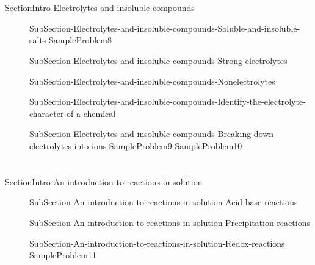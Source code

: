 \documentclass[main.tex]{subfiles} %
\begin{document}
\section{\color{blue!30!black}{Electrolytes and insoluble compounds}}
{SectionIntro-Electrolytes-and-insoluble-compounds}
\sloppy \begin{description}
\item[] {SubSection-Electrolytes-and-insoluble-compounds-Soluble-and-insoluble-salts}
{SampleProblem8}
\vspace{0cm}{Table-Solubility}
\item[]{SubSection-Electrolytes-and-insoluble-compounds-Strong-electrolytes}
\item[]{SubSection-Electrolytes-and-insoluble-compounds-Nonelectrolytes}

\item[]{SubSection-Electrolytes-and-insoluble-compounds-Identify-the-electrolyte-character-of-a-chemical}
 \vspace{1cm}{Table-Electrolytes	}	

\item[]{SubSection-Electrolytes-and-insoluble-compounds-Breaking-down-electrolytes-into-ions}
{SampleProblem9}
{SampleProblem10}
\end{description}


\section{\color{blue!30!black}{An introduction to reactions in solution}}
{SectionIntro-An-introduction-to-reactions-in-solution}
\sloppy \begin{description}
\item[] {SubSection-An-introduction-to-reactions-in-solution-Acid-base-reactions}
\item[]{SubSection-An-introduction-to-reactions-in-solution-Precipitation-reactions}
\item[]{SubSection-An-introduction-to-reactions-in-solution-Redox-reactions}
{SampleProblem11}
\end{description}
\end{document}
